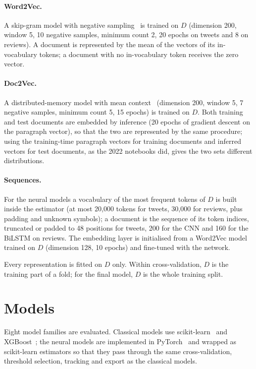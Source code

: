 \paragraph{Word2Vec.} A skip-gram model with negative sampling~\cite{mikolov2013} is trained on $D$ (dimension 200, window 5, 10 negative samples, minimum count 2, 20 epochs on tweets and 8 on reviews). A document is represented by the mean of the vectors of its in-vocabulary tokens; a document with no in-vocabulary token receives the zero vector.

\paragraph{Doc2Vec.} A distributed-memory model with mean context~\cite{le2014} (dimension 200, window 5, 7 negative samples, minimum count 5, 15 epochs) is trained on $D$. Both training and test documents are embedded by inference (20 epochs of gradient descent on the paragraph vector), so that the two are represented by the same procedure; using the training-time paragraph vectors for training documents and inferred vectors for test documents, as the 2022 notebooks did, gives the two sets different distributions.

\paragraph{Sequences.} For the neural models a vocabulary of the most frequent tokens of $D$ is built inside the estimator (at most 20,000 tokens for tweets, 30,000 for reviews, plus padding and unknown symbols); a document is the sequence of its token indices, truncated or padded to 48 positions for tweets, 200 for the CNN and 160 for the BiLSTM on reviews. The embedding layer is initialised from a Word2Vec model trained on $D$ (dimension 128, 10 epochs) and fine-tuned with the network.

Every representation is fitted on $D$ only. Within cross-validation, $D$ is the training part of a fold; for the final model, $D$ is the whole training split.

\section{Models}
\label{sec:models}
Eight model families are evaluated. Classical models use scikit-learn~\cite{pedregosa2011} and XGBoost~\cite{chen2016}; the neural models are implemented in PyTorch~\cite{paszke2019} and wrapped as scikit-learn estimators so that they pass through the same cross-validation, threshold selection, tracking and export as the classical models.


